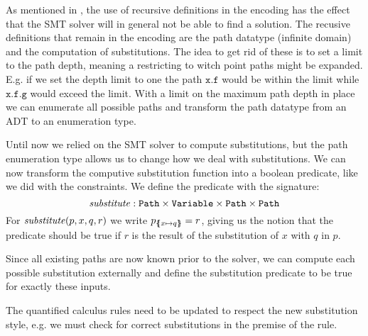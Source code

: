 \documentclass[a4paper]{article}
\begin{document}
As mentioned in , the use of recursive definitions in the encoding has
the effect that the SMT solver will in general not be able to find a solution.
The recusive definitions that remain in the encoding are the path datatype (infinite domain)
and the computation of substitutions.
The idea to get rid of these is to set a limit to the path depth,
meaning a restricting to witch point paths might be expanded.
E.g. if we set the depth limit to one the path $\mathtt{x.f}$ would be within the limit while
$\mathtt{x.f.g}$ would exceed the limit.
With a limit on the maximum path depth in place we can enumerate all possible paths
and transform the path datatype from an ADT to an enumeration type.

Until now we relied on the SMT solver to compute substitutions, but
the path enumeration type allows us to change how we deal with substitutions.
We can now transform the computive substitution function into a boolean predicate,
like we did with the constraints.
We define the predicate with the signature:
\[ \mathit{substitute}: \mathtt{Path} \times \mathtt{Variable} \times \mathtt{Path} \times \mathtt{Path} \]
For $\mathit{substitute}(p, x, q, r)$ we write $p_{\{\mskip-6.9mu\{ x \mapsto q \}\mskip-6.9mu\}}=r$,
giving us the notion that the predicate should be true if $r$ is the result
of the substitution of $x$ with $q$ in $p$.

Since all existing paths are now known prior to the solver,
we can compute each possible substitution externally and define the substitution predicate
to be true for exactly these inputs.

The quantified calculus rules need to be updated to respect the new substitution style,
e.g. we must check for correct substitutions in the premise of the rule.

\end{document}

